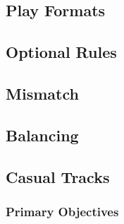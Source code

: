 

\subsection{Play Formats}



\subsection{Optional Rules}



\newpage

\subsection{Mismatch}



\newpage

\subsection{Balancing}



\subsection{Casual Tracks}



\subsubsection{Primary Objectives}

